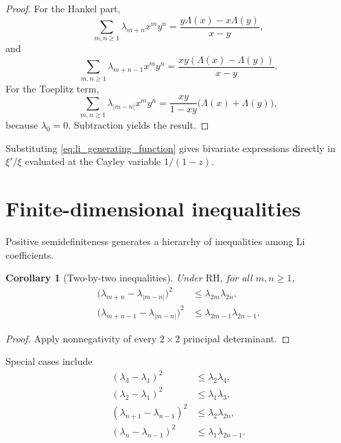 \documentclass[11pt]{amsart}
\numberwithin{equation}{section}
\theoremstyle{plain}
\newtheorem{corollary}[theorem]{Corollary}
\theoremstyle{definition}
\theoremstyle{remark}
\newcommand{\RH}{\mathrm{RH}}
\begin{document}
\begin{proof}
For the Hankel part,
\begin{equation}
\sum_{m,n\ge1}\lambda_{m+n}x^my^n
=
\frac{y\Lambda(x)-x\Lambda(y)}{x-y},
\label{eq:Hankel0_generating}
\end{equation}
and
\begin{equation}
\sum_{m,n\ge1}\lambda_{m+n-1}x^my^n
=
\frac{xy(\Lambda(x)-\Lambda(y))}{x-y}.
\label{eq:Hankelminus1_generating}
\end{equation}
For the Toeplitz term,
\begin{equation}
\sum_{m,n\ge1}\lambda_{|m-n|}x^my^n
=
\frac{xy}{1-xy}\bigl(\Lambda(x)+\Lambda(y)\bigr),
\label{eq:Toeplitz_generating}
\end{equation}
because $\lambda_0=0$. Subtraction yields the result.
\end{proof}

Substituting \eqref{eq:li_generating_function} gives bivariate expressions directly in $\xi'/\xi$ evaluated at the Cayley variable $1/(1-z)$.

\section{Finite-dimensional inequalities}
\label{sec:inequalities}

Positive semidefiniteness generates a hierarchy of inequalities among Li coefficients.

\begin{corollary}[Two-by-two inequalities]
\label{cor:two_by_two_inequalities}
Under $\RH$, for all $m,n\ge1$,
\begin{align}
\bigl(\lambda_{m+n}-\lambda_{|m-n|}\bigr)^2
&\le \lambda_{2m}\lambda_{2n},
\label{eq:E_2x2_inequality}\\
\bigl(\lambda_{m+n-1}-\lambda_{|m-n|}\bigr)^2
&\le \lambda_{2m-1}\lambda_{2n-1}.
\label{eq:O_2x2_inequality}
\end{align}
\end{corollary}

\begin{proof}
Apply nonnegativity of every $2\times2$ principal determinant.
\end{proof}

Special cases include
\begin{align}
(\lambda_3-\lambda_1)^2&\le\lambda_2\lambda_4,
\label{eq:first_even_inequality}\\
(\lambda_2-\lambda_1)^2&\le\lambda_1\lambda_3,
\label{eq:first_odd_inequality}\\
(\lambda_{n+1}-\lambda_{n-1})^2&\le\lambda_2\lambda_{2n},
\label{eq:even_difference_bound}\\
(\lambda_n-\lambda_{n-1})^2&\le\lambda_1\lambda_{2n-1}.
\label{eq:odd_difference_bound}
\end{align}
\end{document}
